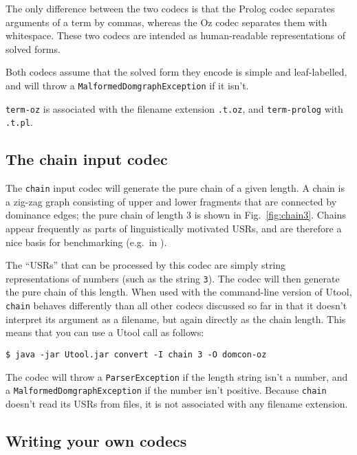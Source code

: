 The only difference between the two codecs is that the Prolog codec
separates arguments of a term by commas, whereas the Oz codec
separates them with whitespace. These two codecs are intended as
human-readable representations of solved forms.

Both codecs assume that the solved form they encode is simple and
leaf-labelled, and will throw a \verb?MalformedDomgraphException? if
it isn't.

\verb?term-oz? is associated with the filename extension \verb?.t.oz?, and
\verb?term-prolog? with \verb?.t.pl?.





\subsection{The chain input codec}

The \verb?chain? input codec will generate the pure chain
\cite{Koller04} of a given length. A chain is a zig-zag graph
consisting of upper and lower fragments that are connected by
dominance edges; the pure chain of length 3 is shown in
Fig.~\ref{fig:chain3}. Chains appear frequently as parts of
linguistically motivated USRs, and are therefore a nice basis for
benchmarking (e.g.\ in \cite{bodirsky-weakly-normal-constraints}).

The ``USRs'' that can be processed by this codec are simply string
representations of numbers (such as the string \verb?3?). The codec
will then generate the pure chain of this length. When used with the
command-line version of Utool, \verb?chain? behaves differently than
all other codecs discussed so far in that it doesn't interpret its
argument as a filename, but again directly as the chain length. This
means that you can use a Utool call as follows:

\begin{verbatim}
$ java -jar Utool.jar convert -I chain 3 -O domcon-oz
\end{verbatim}

The codec will throw a \verb?ParserException? if the length string
isn't a number, and a \verb?MalformedDomgraphException? if the number
isn't positive. Because \verb?chain? doesn't read its USRs from files,
it is not associated with any filename extension.






\subsection{Writing your own codecs}

